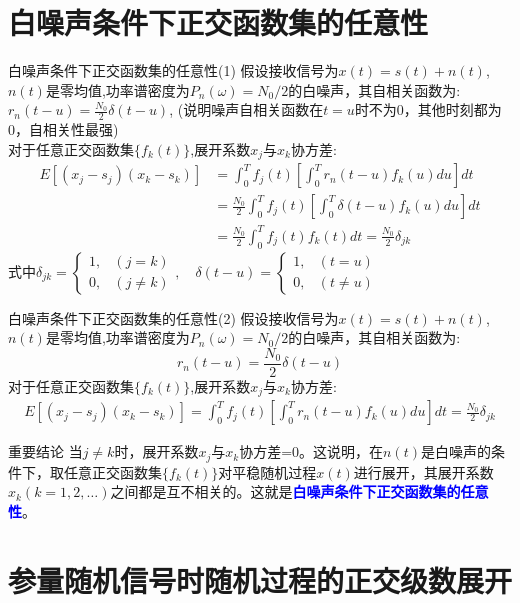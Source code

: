 \section{白噪声条件下正交函数集的任意性}

\begin{frame}{白噪声条件下正交函数集的任意性(1)}
假设接收信号为$x(t)=s(t)+n(t)$, $n(t)$是零均值,功率谱密度为$P_n(\omega)=N_0/2$的白噪声，其自相关函数为: $r_n(t-u)=\frac{N_0}{2}\delta(t-u)$, (说明噪声自相关函数在$t=u$时不为0，其他时刻都为0，自相关性最强)\\
对于任意正交函数集$\{f_k(t)\}$,展开系数$x_j$与$x_k$协方差:
\begin{align*}
E[(x_j-s_j)(x_k-s_k)]&=\int_{0}^{T}f_j(t)\left[\int_{0}^{T}r_n(t-u)f_k(u)du\right]dt\\
&=\frac{N_0}{2}\int_{0}^{T}f_j(t)\left[\int_{0}^{T}\delta(t-u)f_k(u)du\right]dt\\
&=\frac{N_0}{2}\int_{0}^{T}f_j(t)f_k(t)dt=\frac{N_0}{2}\delta_{jk}
\end{align*}
式中$\delta_{jk}=
\begin{cases}
1, & (j=k)\\
0, & (j\ne k) 
\end{cases},\quad
\delta(t-u)=
\begin{cases}
1, & (t=u)\\
0, & (t\ne u) 
\end{cases}
$
\end{frame}

\begin{frame}{白噪声条件下正交函数集的任意性(2)}
假设接收信号为$x(t)=s(t)+n(t)$, $n(t)$是零均值,功率谱密度为$P_n(\omega)=N_0/2$的白噪声，其自相关函数为: 
\[r_n(t-u)=\frac{N_0}{2}\delta(t-u)\]
对于任意正交函数集$\{f_k(t)\}$,展开系数$x_j$与$x_k$协方差:
\begin{align*}
E[(x_j-s_j)(x_k-s_k)]=\int_{0}^{T}f_j(t)\left[\int_{0}^{T}r_n(t-u)f_k(u)du\right]dt=\frac{N_0}{2}\delta_{jk}
\end{align*}
\begin{block}{重要结论}
当$j\ne k$时，展开系数$x_j$与$x_k$协方差=0。这说明，在$n(t)$是白噪声的条件下，取任意正交函数集$\{f_k(t)\}$对平稳随机过程$x(t)$进行展开，其展开系数$x_k(k=1,2,\dots)$之间都是互不相关的。这就是\textbf{\textcolor{blue}{白噪声条件下正交函数集的任意性}}。
\end{block}
\end{frame}

\section{参量随机信号时随机过程的正交级数展开}

